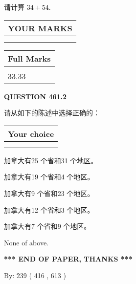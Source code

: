 \documentclass{ctexart}
\begin{document}
  
 
请计算 $ %
34 +  %
54 $.
 

 

 
  
\vspace{0.2in}
  
\noindent\begin{tabular}{|l|}
\hline
 YOUR MARKS  \\
\hline
 \\ 
 \\ 
\hline
\end{tabular}
\hspace{0.05in} \begin{tabular}{|l|}
\hline
 Full Marks  \\
\hline
 \\ 
33.33 \\
\hline
\end{tabular}
{\textbf{\Large{QUESTION
461.2 
}}}
  
  
请从如下的陈述中选择正确的：
  
  
\noindent\hspace{3.0in} \begin{tabular}{|l|}
\hline
Your choice \\
\hline
 \\ 
 \\ 
\hline
\end{tabular}
  
  
 
 
加拿大有25 个省和31 个地区。
 
 
加拿大有19 个省和4 个地区。
 
 
加拿大有9 个省和23 个地区。
 
 
加拿大有12 个省和3 个地区。
 
 
加拿大有7 个省和9 个地区。
 
 
 None of above.
 
 
   
   
 \vspace{0.2in}
 
   
   
   
   
\vspace{1.0in} 
{\textbf{\large{ *** END OF PAPER, THANKS *** }}} 
   
   
\hspace{1.0in} By: 
 239 ( 416 ,  613 )
   
\end{document}
